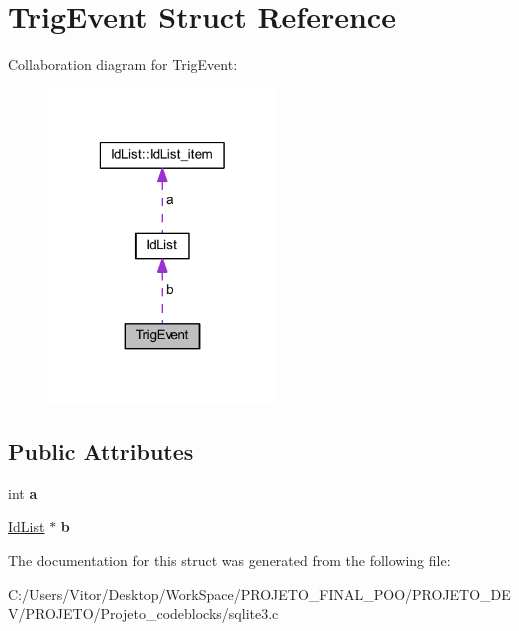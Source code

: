 \hypertarget{struct_trig_event}{\section{Trig\-Event Struct Reference}
\label{struct_trig_event}
}


Collaboration diagram for Trig\-Event\-:\nopagebreak
\begin{figure}[H]
\begin{center}
\leavevmode
\includegraphics[width=172pt]{struct_trig_event__coll__graph}
\end{center}
\end{figure}
\subsection*{Public Attributes}
\begin{DoxyCompactItemize}
\item 
\hypertarget{struct_trig_event_a19ac5a5e59e08350f72ec49cf8fccbb6}{int {\bfseries a}}\label{struct_trig_event_a19ac5a5e59e08350f72ec49cf8fccbb6}

\item 
\hypertarget{struct_trig_event_a86ef160cde95382e98b7934614e7f79f}{\hyperlink{struct_id_list}{Id\-List} $\ast$ {\bfseries b}}\label{struct_trig_event_a86ef160cde95382e98b7934614e7f79f}

\end{DoxyCompactItemize}


The documentation for this struct was generated from the following file\-:\begin{DoxyCompactItemize}
\item 
C\-:/\-Users/\-Vitor/\-Desktop/\-Work\-Space/\-P\-R\-O\-J\-E\-T\-O\-\_\-\-F\-I\-N\-A\-L\-\_\-\-P\-O\-O/\-P\-R\-O\-J\-E\-T\-O\-\_\-\-D\-E\-V/\-P\-R\-O\-J\-E\-T\-O/\-Projeto\-\_\-codeblocks/sqlite3.\-c\end{DoxyCompactItemize}
